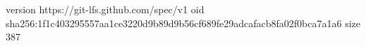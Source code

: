 version https://git-lfs.github.com/spec/v1
oid sha256:1f1c403295557aa1ce3220d9b89d9b56cf689fe29adcafacb8fa02f0bca7a1a6
size 387
